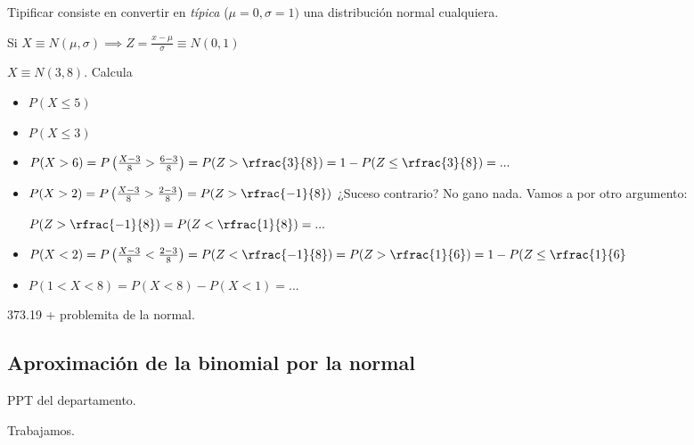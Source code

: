 \begin{defn}[Tipificación]
Tipificar consiste en convertir en \textit{típica} ($\mu=0,\sigma=1)$ una distribución normal cualquiera.

Si $X\equiv N(\mu,\sigma) \implies Z = \displaystyle\frac{x-\mu}{\sigma} \equiv N(0,1)$
\end{defn}

\begin{example} $X\equiv N(3,8)$. Calcula
\begin{itemize}
    \item $P(X\leq 5)$
    \item $P(X\leq 3)$
    \item $P(X>6) = P\left(\frac{X-3}{8} > \frac{6-3}{8}\right) = P(Z>\rfrac{3}{8}) = 1-P(Z\leq\rfrac{3}{8}) = ... $
    \item $P(X>2) = P\left(\frac{X-3}{8} > \frac{2-3}{8}\right) = P(Z>\rfrac{-1}{8})$ ¿Suceso contrario? No gano nada. Vamos a por otro argumento: 
    
    $P(Z>\rfrac{-1}{8}) = P(Z<\rfrac{1}{8}) = ...$
    \item $P(X<2) =  P\left(\frac{X-3}{8} < \frac{2-3}{8}\right) = P(Z<\rfrac{-1}{8}) = P(Z>\rfrac{1}{6}) = 1-P(Z\leq \rfrac{1}{6}
    $
    \item $P(1<X<8) = P(X<8) - P(X<1) = ...$
\end{itemize}
373.19 + problemita de la normal.

\subsection{Aproximación de la binomial por la normal}
PPT del departamento.

Trabajamos.

\end{example}
